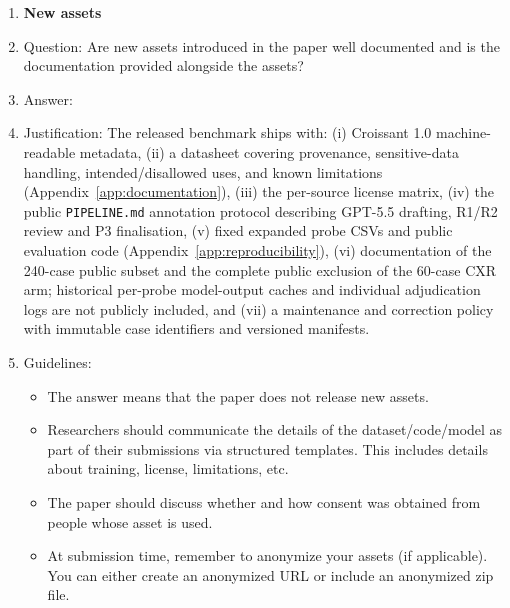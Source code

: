 \begin{enumerate}
\item {\bf New assets}
    \item[] Question: Are new assets introduced in the paper well documented and is the documentation provided alongside the assets?
    \item[] Answer: \answerYes{}
    \item[] Justification: The released benchmark ships with: (i) Croissant 1.0 machine-readable metadata, (ii) a datasheet covering provenance, sensitive-data handling, intended/disallowed uses, and known limitations (Appendix~\ref{app:documentation}), (iii) the per-source license matrix, (iv) the public \texttt{PIPELINE.md} annotation protocol describing GPT-5.5 drafting, R1/R2 review and P3 finalisation, (v) fixed expanded probe CSVs and public evaluation code (Appendix~\ref{app:reproducibility}), (vi) documentation of the 240-case public subset and the complete public exclusion of the 60-case CXR arm; historical per-probe model-output caches and individual adjudication logs are not publicly included, and (vii) a maintenance and correction policy with immutable case identifiers and versioned manifests.
    \item[] Guidelines:
    \begin{itemize}
        \item The answer \answerNA{} means that the paper does not release new assets.
        \item Researchers should communicate the details of the dataset\slash code\slash model as part of their submissions via structured templates. This includes details about training, license, limitations, etc.
        \item The paper should discuss whether and how consent was obtained from people whose asset is used.
        \item At submission time, remember to anonymize your assets (if applicable). You can either create an anonymized URL or include an anonymized zip file.
    \end{itemize}


\end{enumerate}
